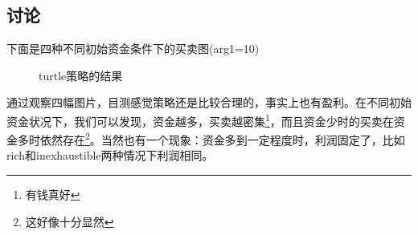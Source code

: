 \documentclass{ctexart}
\begin{document}
	\subsection{讨论}
	下面是四种不同初始资金条件下的买卖图(arg1=10)
	\begin{figure}[H]
		\centering
	\end{figure}
	\begin{figure}[H]
		\centering
	\end{figure}
	\begin{figure}[H]
		\centering
	\end{figure}
	\begin{figure}[H]
		\centering
		\caption{turtle策略的结果}
	\end{figure}
	通过观察四幅图片，目测感觉策略还是比较合理的，事实上也有盈利。在不同初始资金状况下，我们可以发现，资金越多，买卖越密集\footnote{有钱真好}，而且资金少时的买卖在资金多时依然存在\footnote{这好像十分显然}。当然也有一个现象：资金多到一定程度时，利润固定了，比如rich和inexhaustible两种情况下利润相同。
	
\end{document}
